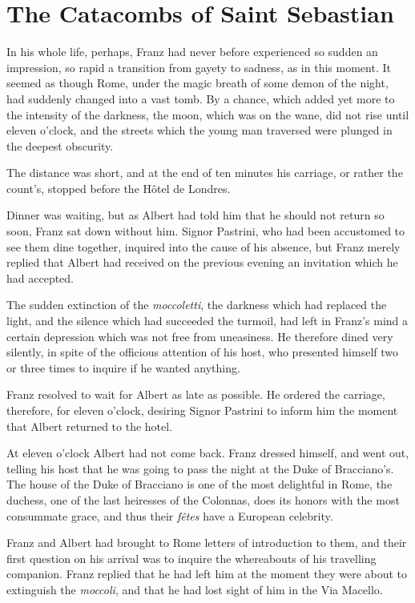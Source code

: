 \chapter{The Catacombs of Saint Sebastian}

In his whole life, perhaps, Franz had never before experienced so
sudden an impression, so rapid a transition from gayety to sadness, as
in this moment. It seemed as though Rome, under the magic breath of
some demon of the night, had suddenly changed into a vast tomb. By a
chance, which added yet more to the intensity of the darkness, the
moon, which was on the wane, did not rise until eleven o’clock, and the
streets which the young man traversed were plunged in the deepest
obscurity.

The distance was short, and at the end of ten minutes his carriage, or
rather the count’s, stopped before the Hôtel de Londres.

Dinner was waiting, but as Albert had told him that he should not
return so soon, Franz sat down without him. Signor Pastrini, who had
been accustomed to see them dine together, inquired into the cause of
his absence, but Franz merely replied that Albert had received on the
previous evening an invitation which he had accepted.

The sudden extinction of the \textit{moccoletti}, the darkness which had
replaced the light, and the silence which had succeeded the turmoil,
had left in Franz’s mind a certain depression which was not free from
uneasiness. He therefore dined very silently, in spite of the officious
attention of his host, who presented himself two or three times to
inquire if he wanted anything.

Franz resolved to wait for Albert as late as possible. He ordered the
carriage, therefore, for eleven o’clock, desiring Signor Pastrini to
inform him the moment that Albert returned to the hotel.

At eleven o’clock Albert had not come back. Franz dressed himself, and
went out, telling his host that he was going to pass the night at the
Duke of Bracciano’s. The house of the Duke of Bracciano is one of the
most delightful in Rome, the duchess, one of the last heiresses of the
Colonnas, does its honors with the most consummate grace, and thus
their \textit{fêtes} have a European celebrity.

Franz and Albert had brought to Rome letters of introduction to them,
and their first question on his arrival was to inquire the whereabouts
of his travelling companion. Franz replied that he had left him at the
moment they were about to extinguish the \textit{moccoli}, and that he had
lost sight of him in the Via Macello.

